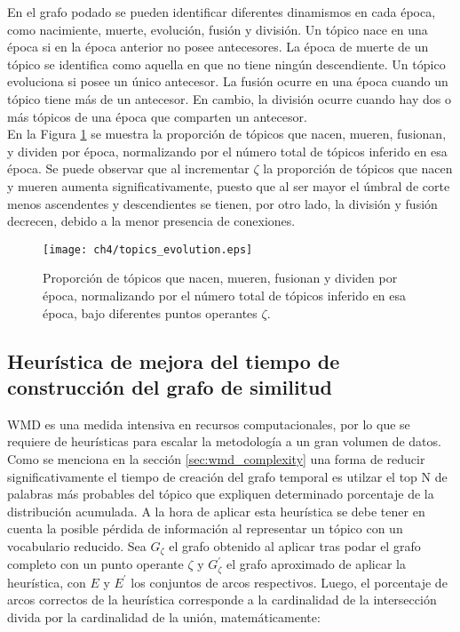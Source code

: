 En el grafo podado se pueden identificar diferentes dinamismos en cada época, como nacimiente, muerte, evolución, fusión y división. Un tópico nace en una época si en la época anterior no posee antecesores. La época de muerte de un tópico se identifica como aquella en que no tiene ningún descendiente. Un tópico evoluciona si posee un único antecesor. La fusión ocurre en una época cuando un tópico tiene más de un antecesor. En cambio, la división ocurre cuando hay dos o más tópicos de una época que comparten un antecesor.\\

En la Figura \ref{img:topics_evolution} se muestra la proporción de tópicos que nacen, mueren, fusionan, y dividen por época, normalizando por el número total de tópicos inferido en esa época. Se puede observar que al incrementar $\zeta$ la proporción de tópicos que nacen y mueren aumenta significativamente, puesto que al ser mayor el úmbral de corte menos ascendentes y descendientes se tienen, por otro lado, la división y fusión decrecen, debido a la menor presencia de conexiones.

\begin{figure}
    \centering
    \texttt{[image: ch4/topics\_evolution.eps]}
    \caption{Proporción de tópicos que nacen, mueren, fusionan y dividen por época, normalizando por el número total de tópicos inferido en esa época, bajo diferentes puntos operantes $\zeta$.}
    \label{img:topics_evolution}
\end{figure}

\subsection{Heurística de mejora del tiempo de construcción del grafo de similitud}

WMD es una medida intensiva en recursos computacionales, por lo que se requiere de heurísticas para escalar la metodología a un gran volumen de datos. Como se menciona en la sección \ref{sec:wmd_complexity} una forma de reducir significativamente el tiempo de creación del grafo temporal es utilzar el top N de palabras más probables del tópico que expliquen determinado porcentaje de la distribución acumulada. A la hora de aplicar esta heurística se debe tener en cuenta la posible pérdida de información al representar un tópico con un vocabulario reducido. Sea $G_{\zeta}$ el grafo obtenido al aplicar tras podar el grafo completo con un punto operante $\zeta$ y $G^{'}_{\zeta}$ el grafo aproximado de aplicar la heurística, con $E$ y $E^{'}$ los conjuntos de arcos respectivos. Luego, el porcentaje de arcos correctos de la heurística corresponde a la cardinalidad de la intersección divida por la cardinalidad de la unión, matemáticamente:


